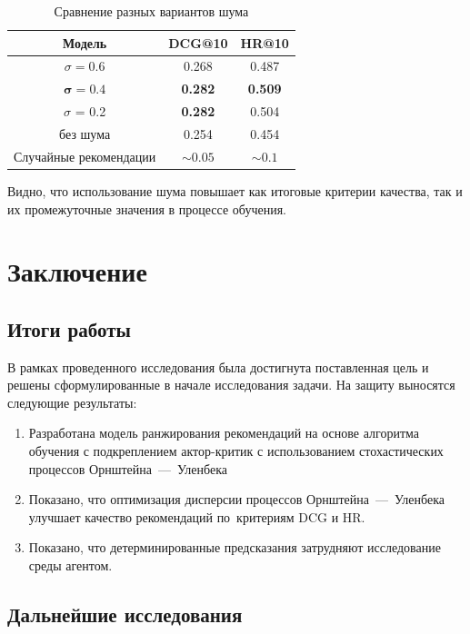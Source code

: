 \documentclass[14pt]{extarticle}
\begin{document}
\begin{center}
	\begin{table}[h]
		\centering
		\begin{tabular}{ccc}
			\hline Модель & DCG@10 &  HR@10 \\
			\hline $\sigma = 0.6$ & 0.268  & 0.487\\
			$\pmb{\sigma = 0.4}$  & {\bf 0.282} & {\bf 0.509} \\
			$\sigma$ = 0.2 & {\bf 0.282}  & 0.504\\
		    без шума & 0.254 & 0.454 \\
			Случайные рекомендации & $\sim 0.05$ & $\sim 0.1$   \\
			\hline 
		\end{tabular}
		\caption{Сравнение разных вариантов шума}
		\label{Tab:results}
	\end{table}
\end{center}

Видно, что использование шума повышает как итоговые критерии качества, так и их промежуточные значения в процессе обучения.

\newpage

\section{Заключение}

\subsection{Итоги работы}

В рамках проведенного исследования была достигнута поставленная цель и решены
сформулированные в начале исследования задачи. На защиту выносятся следующие результаты:
\begin{enumerate}
\item Разработана модель ранжирования рекомендаций на основе алгоритма обучения с подкреплением актор-критик с использованием стохастических процессов Орнштейна~---~Уленбека
\item Показано, что оптимизация дисперсии процессов Орнштейна~---~Уленбека улучшает качество рекомендаций по~критериям DCG и HR.
\item Показано, что детерминированные предсказания затрудняют исследование среды агентом.
\end{enumerate}

\subsection{Дальнейшие исследования}
\end{document}
